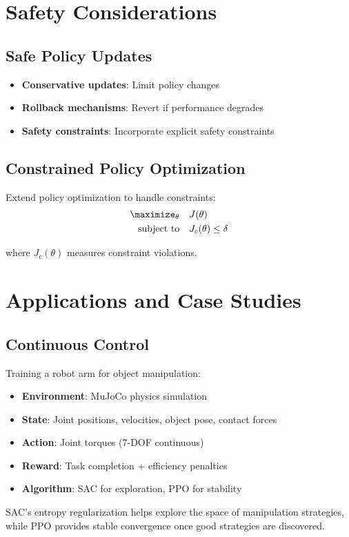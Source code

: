 \section{Safety Considerations}

\subsection{Safe Policy Updates}

\begin{itemize}
    \item \textbf{Conservative updates}: Limit policy changes
    \item \textbf{Rollback mechanisms}: Revert if performance degrades
    \item \textbf{Safety constraints}: Incorporate explicit safety constraints
\end{itemize}

\subsection{Constrained Policy Optimization}

Extend policy optimization to handle constraints:
\begin{align}
\maximize_\theta \quad & J(\theta) \\
\text{subject to} \quad & J_c(\theta) \leq \delta
\end{align}

where $J_c(\theta)$ measures constraint violations.

\section{Applications and Case Studies}

\subsection{Continuous Control}

\begin{examplebox}
Training a robot arm for object manipulation:
\begin{itemize}
    \item \textbf{Environment}: MuJoCo physics simulation
    \item \textbf{State}: Joint positions, velocities, object pose, contact forces
    \item \textbf{Action}: Joint torques (7-DOF continuous)
    \item \textbf{Reward}: Task completion + efficiency penalties
    \item \textbf{Algorithm}: SAC for exploration, PPO for stability
\end{itemize}

SAC's entropy regularization helps explore the space of manipulation strategies, while PPO provides stable convergence once good strategies are discovered.
\end{examplebox}

